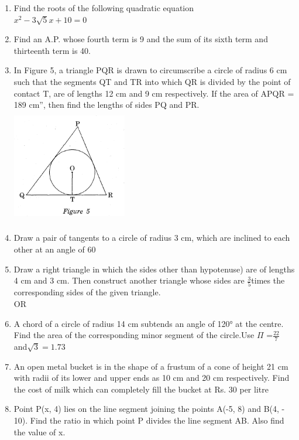 \documentclass[journal,12pt,twocolumn]{IEEEtran}
\renewcommand\thesection{\arabic{section}}
\begin{document}
\begin{enumerate}[label=\thesection.\arabic*.,ref=\thesection.\theenumi]
\item Find the roots of the following quadratic equation\\
$x^2-3\sqrt{5}x+10 =0$
\item Find an A.P. whose fourth term is 9 and the sum of its sixth term and thirteenth term is 40.
\item In Figure 5, a triangle PQR is drawn to circumscribe a circle of radius 6 cm such that the segments QT and TR into which QR is divided by the point of contact T, are of lengths 12 cm and 9 cm respectively. If the area of APQR = 189 cm”, then find the lengths of sides PQ and PR.
\includegraphics[width=5cm,height=5cm,center]{7.png}
\item Draw a pair of tangents to a circle of radius 3 cm, which are inclined to each other at an angle of 60\degree
\item Draw a right triangle in which the sides other than hypotenuse) are of lengths 4 cm and 3 cm. Then construct another triangle whose sides are $\frac{3}{5}$times the corresponding sides of the given triangle.\\
OR
\item A chord of a circle of radius 14 cm subtends an angle of 120° at the centre. Find the area of the corresponding minor segment of the circle.Use $\Pi$ =$\frac{22}{7}$ and$\sqrt{3}=1.73$\\
\item An open metal bucket is in the shape of a frustum of a cone of height 21 cm with radii of its lower and upper ends as 10 cm and 20 cm respectively. Find the cost of milk which can completely fill the bucket at Rs. 30 per litre
\item Point P(x, 4) lies on the line segment joining the points A(-5, 8) and B(4, - 10). Find the ratio in which point P divides the line segment AB. Also find the value of x.

\end{enumerate}
\end{document}
